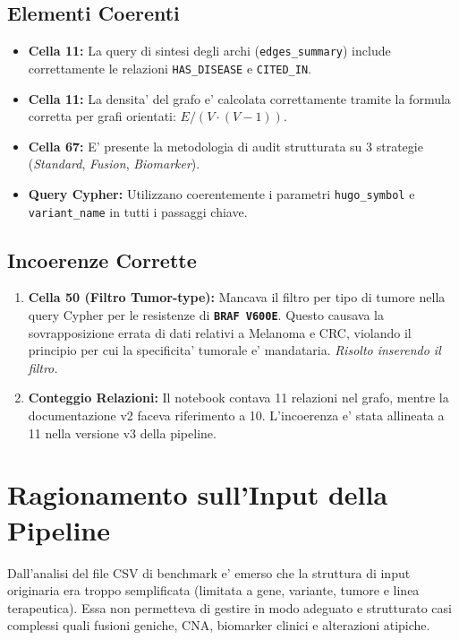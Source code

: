 \documentclass[12pt, a4paper]{article}
\newcommand{\bench}[1]{{\texttt{\textbf{#1}}}}
\begin{document}
\subsection{Elementi Coerenti}
\begin{itemize}[leftmargin=1.6em, itemsep=2pt]
  \item \textbf{Cella 11:} La query di sintesi degli archi (\texttt{edges\_summary}) include correttamente le relazioni \texttt{HAS\_DISEASE} e \texttt{CITED\_IN}.
  \item \textbf{Cella 11:} La densita' del grafo e' calcolata correttamente tramite la formula corretta per grafi orientati: $E / (V \cdot (V - 1))$.
  \item \textbf{Cella 67:} E' presente la metodologia di audit strutturata su 3 strategie (\textit{Standard}, \textit{Fusion}, \textit{Biomarker}).
  \item \textbf{Query Cypher:} Utilizzano coerentemente i parametri \texttt{hugo\_symbol} e \texttt{variant\_name} in tutti i passaggi chiave.
\end{itemize}

\subsection{Incoerenze Corrette}
\begin{enumerate}[leftmargin=1.6em, itemsep=3pt]
  \item \textbf{Cella 50 (Filtro Tumor-type):} Mancava il filtro per tipo di tumore nella query Cypher per le resistenze di \bench{BRAF V600E}. Questo causava la sovrapposizione errata di dati relativi a Melanoma e CRC, violando il principio per cui la specificita' tumorale e' mandataria. \textit{Risolto inserendo il filtro.}
  \item \textbf{Conteggio Relazioni:} Il notebook contava 11 relazioni nel grafo, mentre la documentazione v2 faceva riferimento a 10. L'incoerenza e' stata allineata a 11 nella versione v3 della pipeline.
\end{enumerate}

\section{Ragionamento sull'Input della Pipeline}

Dall'analisi del file CSV di benchmark e' emerso che la struttura di input originaria era troppo semplificata (limitata a gene, variante, tumore e linea terapeutica). Essa non permetteva di gestire in modo adeguato e strutturato casi complessi quali fusioni geniche, CNA, biomarker clinici e alterazioni atipiche.
\end{document}

